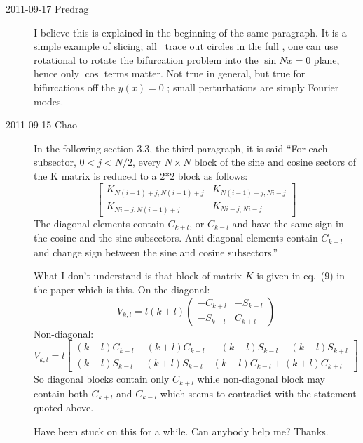 \begin{description}
\item[2011-09-17 Predrag] I believe this is explained in the beginning of
the same paragraph. It is a simple example of slicing; all \reqva\ trace
out circles in the full \statesp, one can use rotational  to
rotate the bifurcation problem into the $\sin Nx = 0$ plane, hence only $\cos$
terms matter. Not true in general, but true for bifurcations off the $y(x)=0$
\eqv; small perturbations are simply Fourier modes.


\item[2011-09-15 Chao]
In the following section 3.3, the third paragraph, it is said ``For each
subsector, $0<j<N/2$, every $N \times N$ block of the sine and cosine sectors of the
K matrix is reduced to a 2*2 block as follows:
\[
\left[
\begin{array}{cc}
K_{N(i-1)+j,N(i-1)+j}   &  K_{N(i-1)+j,Ni-j}\\
K_{Ni-j,N(i-1)+j}   &   K_{Ni-j,Ni-j}
\end{array}
\right]
\]
The diagonal elements contain $C_{k+l}$, or $C_{k-l}$ and have the same
sign in the cosine and the sine subsectors. Anti-diagonal elements
contain $C_{k+l}$ and change sign between the sine and cosine
subsectors.''

What I don't understand is that block of matrix $K$ is given in eq.~(9) in
the paper which is this. On the diagonal:
\[
V_{k,l}
=
l(k+l)
\left(
\begin{array}{cc}
-C_{k+l}   &  -S_{k+l}\\
-S_{k+l}   &   C_{k+l}
\end{array}
\right)
\]
Non-diagonal:
\[
V_{k,l}
=
l
\left[
\begin{array}{cc}
(k-l)C_{k-l}-(k+l)C_{k+l}   &  -(k-l)S_{k-l}-(k+l)S_{k+l}\\
(k-l)S_{k-l}-(k+l)S_{k+l}   &   (k-l)C_{k-l}+(k+l)C_{k+l}
\end{array}
\right]
\]
So diagonal blocks contain only $C_{k+l}$ while non-diagonal block may
contain both $C_{k+l}$ and $C_{k-l}$ which seems to contradict with the
statement quoted above.

Have been stuck on this for a while. Can anybody help me? Thanks.



\end{description}
